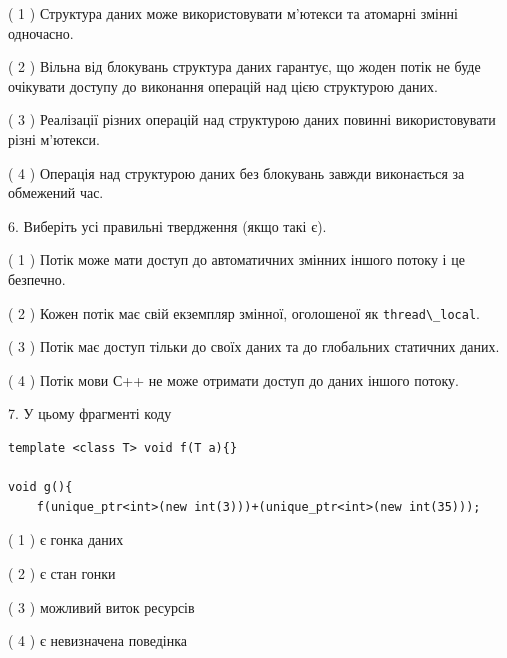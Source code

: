 \documentclass[12pt, ukrainian]{article}
\def\code#1{\Verb!#1!}
\begin{document}
\begin {large}
{( 1 ) Структура даних може використовувати м’ютекси та атомарні змінні одночасно.%

( 2 ) Вільна від блокувань структура даних гарантує, що жоден потік не буде очікувати доступу до виконання операцій над цією структурою даних.%

( 3 ) Реалізації різних операцій над структурою даних повинні використовувати різні м’ютекси.%

( 4 ) Операція над структурою даних без блокувань завжди виконається за обмежений час.%
\newpage



\vspace{5mm}
6. Виберіть усі правильні твердження (якщо такі є).\par
\vspace{2mm}

( 1 ) Потік може мати доступ до автоматичних змінних іншого потоку і це безпечно.%

( 2 ) Кожен потік має свій екземпляр змінної, оголошеної як \code{thread\_local}.%

( 3 ) Потік має доступ тільки до своїх даних та до глобальних статичних даних.%

( 4 ) Потік мови С++ не може отримати доступ до даних іншого потоку.%


\vspace{5mm}
7. У цьому фрагменті коду
\begin{verbatim}
template <class T> void f(T a){}

void g(){
    f(unique_ptr<int>(new int(3)))+(unique_ptr<int>(new int(35)));
\end{verbatim}

( 1 ) є гонка даних%

( 2 ) є стан гонки%

( 3 ) можливий виток ресурсів%

( 4 ) є невизначена поведінка%
}
\end {large}
\end{document}
